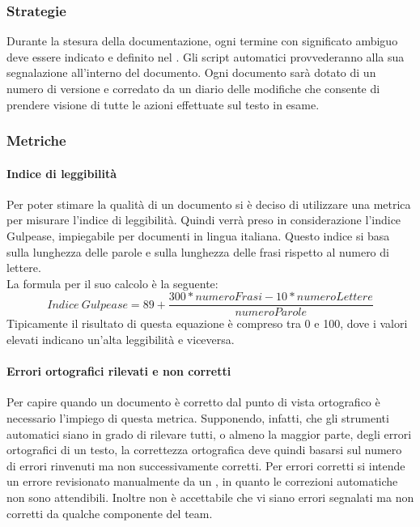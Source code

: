 \documentclass[../PianoDiQualifica.tex]{subfiles}
\begin{document}
			\subsubsection{Strategie}
			Durante la stesura della documentazione, ogni termine con significato ambiguo deve essere indicato e definito nel \glossario. Gli script automatici provvederanno alla sua segnalazione all'interno del documento.
			Ogni documento sarà dotato di un numero di versione e corredato da un diario delle modifiche che consente di prendere visione di tutte le azioni effettuate sul testo in esame.

			\subsubsection{Metriche}
			\paragraph{Indice di leggibilità}
			Per poter stimare la qualità di un documento si è deciso di utilizzare una metrica per misurare l'indice di leggibilità. Quindi verrà preso in considerazione l'indice Gulpease, impiegabile per documenti in lingua italiana. Questo indice si basa sulla lunghezza delle parole e sulla lunghezza delle frasi rispetto al numero di lettere.\\La formula per il suo calcolo è la seguente:
			\begin{equation*}
				Indice \ Gulpease = 89 + \frac{300*numeroFrasi - 10*numeroLettere}{numeroParole}
			\end{equation*}
			Tipicamente il risultato di questa equazione è compreso tra 0 e 100, dove i valori elevati indicano un'alta leggibilità e viceversa.\\

			\paragraph{Errori ortografici rilevati e non corretti}
			Per capire quando un documento è corretto dal punto di vista ortografico è necessario l'impiego di questa metrica. Supponendo, infatti, che gli strumenti automatici siano in grado di rilevare tutti, o almeno la maggior parte, degli errori ortografici di un testo, la correttezza ortografica deve quindi basarsi sul numero di errori rinvenuti ma non successivamente corretti. Per errori corretti si intende un errore revisionato manualmente da un \verificatore, in quanto le correzioni automatiche non sono attendibili. Inoltre non è accettabile che vi siano errori segnalati ma non corretti da qualche componente del team.
\end{document}
